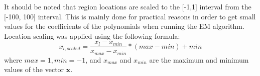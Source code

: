 It should be noted that region locations are scaled to the [-1,1] interval from the [-100, 100] interval. This is mainly done for practical reasons in order to get small values for the coefficients of the polynomials when running the EM algorithm. Location scaling was applied using the following formula:
\begin{equation}
	x_{l,scaled} = \frac{x_{l} - x_{min}}{x_{max} - x_{min}} * (max - min) + min
\end{equation}
where $max=1, min=-1$, and $x_{max}$ and $x_{min}$ are the maximum and minimum values of the vector $\mathbf{x}$.